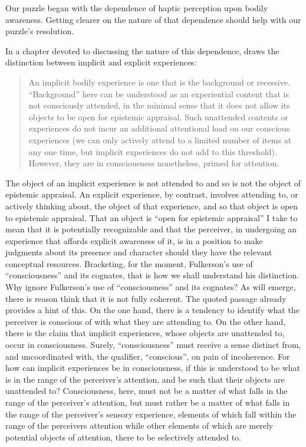Our puzzle began with the dependence of haptic perception upon bodily awareness. Getting clearer on the nature of that dependence should help with our puzzle's resolution. 

In a chapter devoted to discussing the nature of this dependence, \citet[chapter 4.6]{Fulkerson:2014ek} draws the distinction between implicit and explicit experiences:
\begin{quote}
	An implicit bodily experience is one that is the background or recessive. ``Background'' here can be understood as an experiential content that is not consciously attended, in the minimal sense that it does not allow its objects to be open for epistemic appraisal. Such unattended contents or experiences do not incur an additional attentional load on our conscious experiences (we can only actively attend to a limited number of items at any one time, but implicit experiences do not add to this threshold). However, they are in consciousness nonetheless, primed for attention. \citep[90]{Fulkerson:2014ek}
\end{quote}
The object of an implicit experience is not attended to and so is not the object of epistemic appraisal. An explicit experience, by contrast, involves attending to, or actively thinking about, the object of that experience, and so that object is open to epistemic appraisal. That an object is ``open for epistemic appraisal'' I take to mean that it is potentially recognizable and that the perceiver, in undergoing an experience that affords explicit awareness of it, is in a position to make judgments about its presence and character should they have the relevant conceptual resources. Bracketing, for the moment, Fulkerson's use of ``consciousness'' and its cognates, that is how we shall understand his distinction. Why ignore Fulkerson's use of ``consciousness'' and its cognates? As will emerge, there is reason think that it is not fully coherent. The quoted passage already provides a hint of this. On the one hand, there is a tendency to identify what the perceiver is conscious of with what they are attending to. On the other hand, there is the claim that implicit experiences, whose objects are unattended to, occur in consciousness. Surely,  ``consciousness'' must receive a sense distinct from, and uncoordinated with, the qualifier, ``conscious'', on pain of incoherence. For how can implicit experiences be in consciousness, if this is understood to be what is in the range of the perceiver's attention, and be such that their objects are unattended to? Consciousness, here, must not be a matter of what falls in the range of the perceiver's attention, but must rather be a matter of what falls in the range of the perceiver's sensory experience, elements of which fall within the range of the perceivers attention while other elements of which are merely potential objects of attention, there to be selectively attended to.

